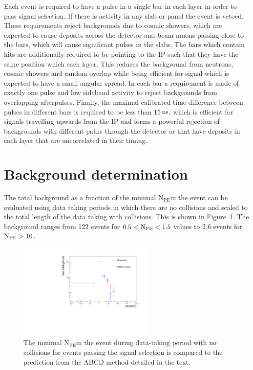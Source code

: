 \documentclass[12pt]{article}
\newcommand{\unit}[1]{\ensuremath{\text{\,#1}}\xspace}
\newcommand{\npe} {\mbox{\ensuremath{\textrm{N}_\textrm{PE}}\xspace}}
\begin{document}
Each event is required to have a pulse in
a single bar in each layer in order to pass signal selection. If there is activity in any slab or panel the event is 
vetoed. These requirements reject backgrounds due to cosmic showers, which are expected to cause deposits
across the detector and beam muons passing close to the bars, which will cause significant pulses in
the slabs. The bars which contain hits are additionally required to be pointing to the IP such that they 
have the same position which each layer. This reduces the background from neutrons, cosmic showers and random overlap
while being efficient for signal which is expected to have a small angular spread. In each bar a requirement is
made of exactly one pulse and low sideband activity to reject backgrounds from overlapping afterpulses. Finally, the
maximal calibrated time difference between pulses in different bars is required to be less than 15\unit{ns}, which is 
efficient for signals travelling upwards from the IP and forms a powerful rejection of backgrounds
with different paths through the detector or that have deposits 
in each layer that are uncorrelated in their timing.


\section{Background determination}

The total background as a function of the minimal \npe in the event can be evaluated 
using data taking periods in which there are no collisions and scaled to the 
total length of the data taking with collisions. This is shown in Figure~\ref{fig:bkgNoBeam}.
The background ranges from 122 events for $0.5 < \npe < 1.5$ values to 2.6 events for $\npe > 10$.

\begin{figure}[ht!]
    \centering
    \includegraphics[width=0.6\textwidth]{figures/backgroundYieldsNoBeam_15ns_07}
    \caption{\label{fig:bkgNoBeam} The minimal \npe in the event during data-taking period with 
    no collisions for events passing the signal selection is
   compared to the prediction from the ABCD method detailed in the text.}
\end{figure}
\end{document}
